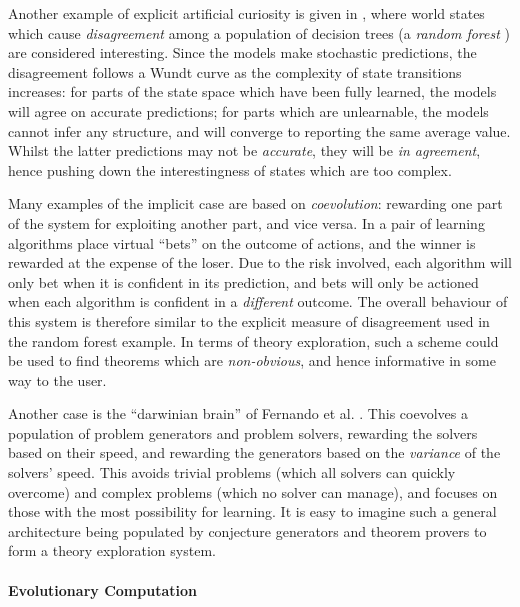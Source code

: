 Another example of explicit artificial curiosity is given in
\cite{Hester.Stone:2012}, where world states which cause \emph{disagreement}
among a population of decision trees (a \emph{random forest}
\cite{randomforests}) are considered interesting. Since the models make
stochastic predictions, the disagreement follows a Wundt curve as the complexity
of state transitions increases: for parts of the state space which have been
fully learned, the models will agree on accurate predictions; for parts which
are unlearnable, the models cannot infer any structure, and will converge to
reporting the same average value. Whilst the latter predictions may not be
\emph{accurate}, they will be \emph{in agreement}, hence pushing down the
interestingness of states which are too complex.

Many examples of the implicit case are based on \emph{coevolution}: rewarding
one part of the system for exploiting another part, and vice versa. In
\cite{Schmidhuber1999} a pair of learning algorithms place virtual ``bets'' on
the outcome of actions, and the winner is rewarded at the expense of the
loser. Due to the risk involved, each algorithm will only bet when it is
confident in its prediction, and bets will only be actioned when each algorithm
is confident in a \emph{different} outcome. The overall behaviour of this system
is therefore similar to the explicit measure of disagreement used in the random
forest example. In terms of theory exploration, such a scheme could be used to
find theorems which are \emph{non-obvious}, and hence informative in some way to
the user.

Another case is the ``darwinian brain'' of Fernando et
al. \cite{fernando2013design1, fernando2013design2}. This coevolves a
population of problem generators and problem solvers, rewarding the solvers
based on their speed, and rewarding the generators based on the \emph{variance}
of the solvers' speed. This avoids trivial problems (which all solvers can
quickly overcome) and complex problems (which no solver can manage), and focuses
on those with the most possibility for learning. It is easy to imagine such a
general architecture being populated by conjecture generators and theorem
provers to form a theory exploration system.

\paragraph{Evolutionary Computation} \leavevmode \newline

